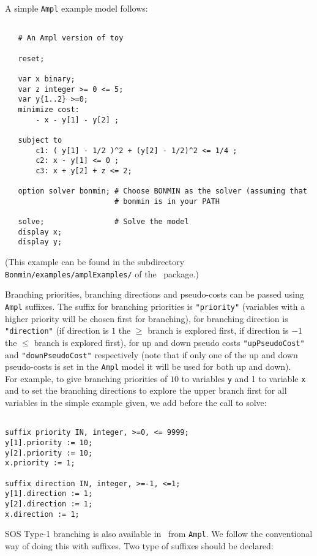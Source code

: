 A simple {\tt Ampl} example model follows:

\begin{verbatim}

   # An Ampl version of toy

   reset;

   var x binary;
   var z integer >= 0 <= 5;
   var y{1..2} >=0;
   minimize cost:
       - x - y[1] - y[2] ;

   subject to
       c1: ( y[1] - 1/2 )^2 + (y[2] - 1/2)^2 <= 1/4 ;
       c2: x - y[1] <= 0 ;
       c3: x + y[2] + z <= 2;

   option solver bonmin; # Choose BONMIN as the solver (assuming that
                         # bonmin is in your PATH

   solve;                # Solve the model
   display x;
   display y;

\end{verbatim}
(This example can be found in the subdirectory {\tt Bonmin/examples/amplExamples/} of
the \Bonmin\ package.)

Branching priorities, branching directions and pseudo-costs can be passed using {\tt Ampl} suffixes.
The suffix for branching priorities is {\tt "priority"} (variables with a higher priority
will be chosen first for branching),
for branching direction is {\tt "direction"} (if direction is $1$ the $\geq$ branch
is explored first, if direction is $-1$ the $\leq$ branch is explored first), for up
and down pseudo costs {\tt "upPseudoCost"} and {\tt "downPseudoCost"} respectively
(note that if only one of the up and down pseudo-costs is set in the {\tt Ampl} model it will
be used for both up and down).\\

For example, to give branching priorities of $10$ to variables {\tt y} and 1 to variable {\tt x}
and to set the branching directions to explore the upper branch first for all variables
in the simple example given, we add before the call to solve:
\begin{verbatim}

suffix priority IN, integer, >=0, <= 9999;
y[1].priority := 10;
y[2].priority := 10;
x.priority := 1;

suffix direction IN, integer, >=-1, <=1;
y[1].direction := 1;
y[2].direction := 1;
x.direction := 1;

\end{verbatim}

SOS Type-1 branching is also available in \Bonmin\ from {\tt Ampl}. We
follow the conventional way of doing this with suffixes.
Two type of suffixes should be declared:

